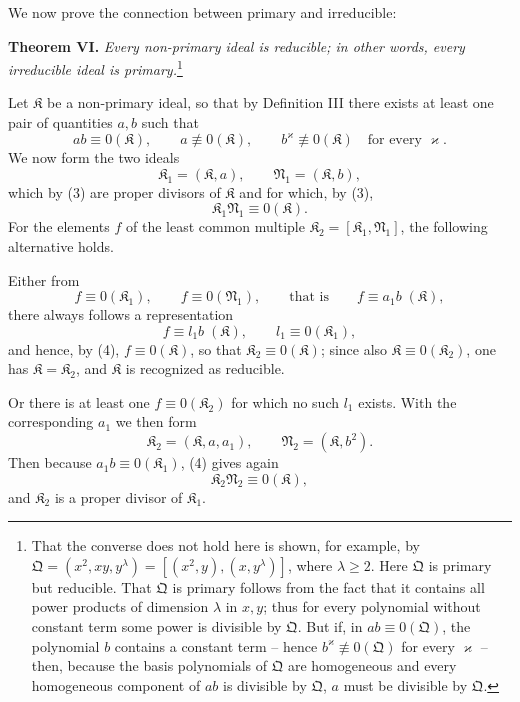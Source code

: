 \documentclass[11pt]{article}
\newcommand{\ideal}[1]{\mathfrak{#1}}
\begin{document}
We now prove the connection between primary and irreducible:

\textbf{Theorem VI.} \emph{Every non-primary ideal is reducible; in other words, every irreducible ideal is primary.}\footnote{That the converse does not hold here is shown, for example, by $\ideal Q=(x^2,xy,y^\lambda)=[(x^2,y),(x,y^\lambda)]$, where $\lambda\ge2$. Here $\ideal Q$ is primary but reducible. That $\ideal Q$ is primary follows from the fact that it contains all power products of dimension $\lambda$ in $x,y$; thus for every polynomial without constant term some power is divisible by $\ideal Q$. But if, in $ab\equiv0(\ideal Q)$, the polynomial $b$ contains a constant term -- hence $b^\varkappa\not\equiv0(\ideal Q)$ for every $\varkappa$ -- then, because the basis polynomials of $\ideal Q$ are homogeneous and every homogeneous component of $ab$ is divisible by $\ideal Q$, $a$ must be divisible by $\ideal Q$.}

Let $\ideal K$ be a non-primary ideal, so that by Definition III there exists at least one pair of quantities $a,b$ such that
\begin{equation}
 ab\equiv0(\ideal K),\qquad
 a\not\equiv0(\ideal K),\qquad
 b^\varkappa\not\equiv0(\ideal K)\quad\text{for every }\varkappa.
\tag{3}
\end{equation}
We now form the two ideals
\[
 \ideal K_1=(\ideal K,a),
 \qquad
 \ideal N_1=(\ideal K,b),
\]
which by (3) are proper divisors of $\ideal K$ and for which, by (3),
\begin{equation}
 \ideal K_1\ideal N_1\equiv0(\ideal K).
\tag{4}
\end{equation}
For the elements $f$ of the least common multiple $\ideal K_2=[\ideal K_1,\ideal N_1]$, the following alternative holds.

Either from
\[
 f\equiv0(\ideal K_1),\qquad f\equiv0(\ideal N_1),
 \qquad\text{that is}\qquad f\equiv a_1 b\;(\ideal K),
\]
there always follows a representation
\[
 f\equiv l_1b\;(\ideal K),
 \qquad l_1\equiv0(\ideal K_1),
\]
and hence, by (4), $f\equiv0(\ideal K)$, so that $\ideal K_2\equiv0(\ideal K)$; since also $\ideal K\equiv0(\ideal K_2)$, one has $\ideal K=\ideal K_2$, and $\ideal K$ is recognized as reducible.

Or there is at least one $f\equiv0(\ideal K_2)$ for which no such $l_1$ exists. With the corresponding $a_1$ we then form
\[
 \ideal K_2=(\ideal K,a,a_1),
 \qquad
 \ideal N_2=(\ideal K,b^2).
\]
Then because $a_1b\equiv0(\ideal K_1)$, (4) gives again
\begin{equation}
 \ideal K_2\ideal N_2\equiv0(\ideal K),
\tag{4'}
\end{equation}
and $\ideal K_2$ is a proper divisor of $\ideal K_1$.
\end{document}
